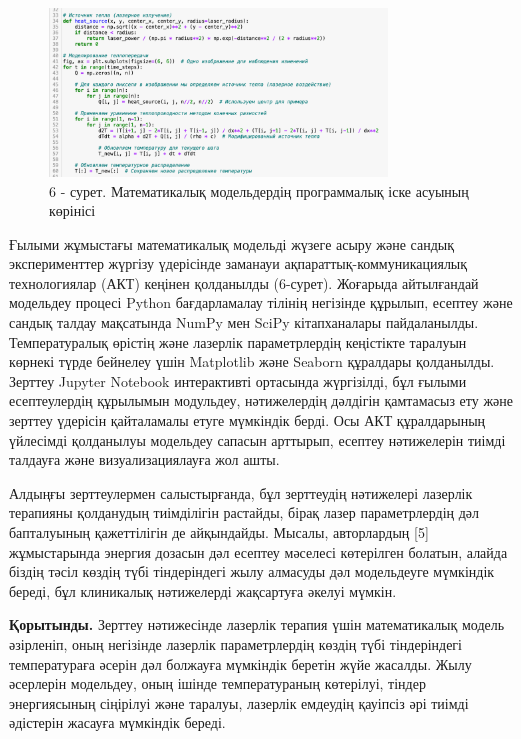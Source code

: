 \begin{figure}[H]
	\centering
	\includegraphics[width=0.8\textwidth]{media/ict/image25}
	\caption*{6 - сурет. Математикалық модельдердің программалық іске асуының көрінісі}
\end{figure}

\begin{multicols}{2}
Ғылыми жұмыстағы математикалық модельді жүзеге асыру және сандық
эксперименттер жүргізу үдерісінде заманауи ақпараттық-коммуникациялық
технологиялар (АКТ) кеңінен қолданылды (6-сурет). Жоғарыда айтылғандай
модельдеу процесі Python бағдарламалау тілінің негізінде құрылып,
есептеу және сандық талдау мақсатында NumPy мен SciPy кітапханалары
пайдаланылды. Температуралық өрістің және лазерлік параметрлердің
кеңістікте таралуын көрнекі түрде бейнелеу үшін Matplotlib және Seaborn
құралдары қолданылды. Зерттеу Jupyter Notebook интерактивті ортасында
жүргізілді, бұл ғылыми есептеулердің құрылымын модульдеу, нәтижелердің
дәлдігін қамтамасыз ету және зерттеу үдерісін қайталамалы етуге
мүмкіндік берді. Осы АКТ құралдарының үйлесімді қолданылуы модельдеу
сапасын арттырып, есептеу нәтижелерін тиімді талдауға және
визуализациялауға жол ашты.

Алдыңғы зерттеулермен салыстырғанда, бұл зерттеудің нәтижелері лазерлік
терапияны қолданудың тиімділігін растайды, бірақ лазер параметрлердің
дәл бапталуының қажеттілігін де айқындайды. Мысалы, авторлардың {[}5{]}
жұмыстарында энергия дозасын дәл есептеу мәселесі көтерілген болатын,
алайда біздің тәсіл көздің түбі тіндеріндегі жылу алмасуды дәл
модельдеуге мүмкіндік береді, бұл клиникалық нәтижелерді жақсартуға
әкелуі мүмкін.

{\bfseries Қорытынды.} Зерттеу нәтижесінде лазерлік терапия үшін
математикалық модель әзірленіп, оның негізінде лазерлік параметрлердің
көздің түбі тіндеріндегі температураға әсерін дәл болжауға мүмкіндік
беретін жүйе жасалды. Жылу әсерлерін модельдеу, оның ішінде
температураның көтерілуі, тіндер энергиясының сіңірілуі және таралуы,
лазерлік емдеудің қауіпсіз әрі тиімді әдістерін жасауға мүмкіндік
береді.


\end{multicols}
